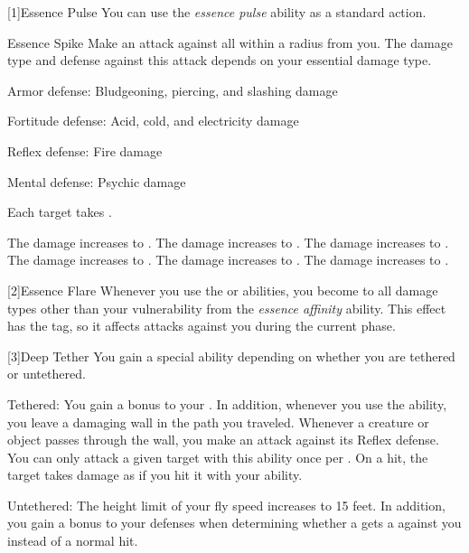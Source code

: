         [1]{Essence Pulse} You can use the \textit{essence pulse} ability as a standard action.
        \begin{magicalactiveability}{Essence Spike}
            \rankline
            Make an attack against all  within a \smallarea radius from you.
            The damage type and defense against this attack depends on your essential damage type.
            \begin{raggeditemize}
                \item Armor defense: Bludgeoning, piercing, and slashing damage
                \item Fortitude defense: Acid, cold, and electricity damage
                \item Reflex defense: Fire damage
                \item Mental defense: Psychic damage
            \end{raggeditemize}
            \hit Each target takes \damagerankone{}.

            \rankline
             The damage increases to \damageranktwo{}.
             The damage increases to \damagerankthree{}.
             The damage increases to \damagerankfour{}.
             The damage increases to \damagerankfive{}.
             The damage increases to \damageranksix{}.
             The damage increases to \damagerankseven{}.
        \end{magicalactiveability}

        [2]{Essence Flare} Whenever you use the  or  abilities, you  become \impervious to all damage types other than your vulnerability from the \textit{essence affinity} ability.
        This effect has the  tag, so it affects attacks against you during the current phase.

        [3]{Deep Tether} You gain a special ability depending on whether you are tethered or untethered.
        \begin{raggeditemize}
            \item Tethered: You gain a  bonus to your .
                In addition, whenever you use the  ability, you leave a damaging wall in the path you traveled.
                Whenever a creature or object passes through the wall, you make an attack against its Reflex defense.
                You can only attack a given target with this ability once per .
                On a hit, the target takes damage as if you hit it with your  ability.
            \item Untethered: The height limit of your fly speed increases to 15 feet.
                In addition, you gain a  bonus to your defenses when determining whether a  gets a  against you instead of a normal hit.
        \end{raggeditemize}

